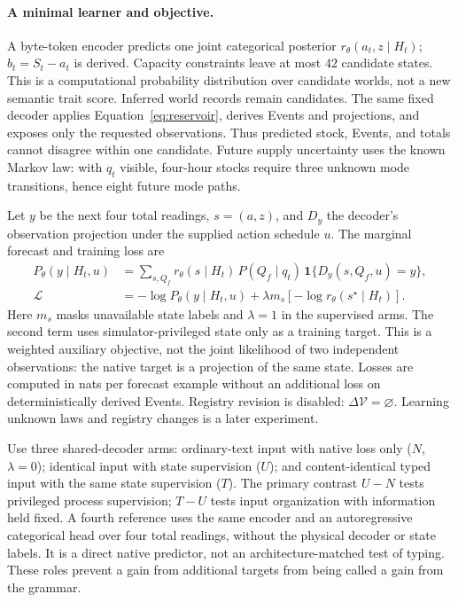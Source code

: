 \documentclass[10pt]{article}
\begin{document}
\paragraph{A minimal learner and objective.}
A byte-token encoder predicts one joint categorical posterior
$r_\theta(a_t,z\mid H_t)$; $b_t=S_t-a_t$ is derived. Capacity constraints leave
at most $42$ candidate states. This is a computational probability
distribution over candidate worlds, not a new semantic trait score. Inferred
world records remain candidates. The same fixed decoder applies
Equation~\ref{eq:reservoir}, derives Events and projections, and exposes only
the requested observations. Thus predicted stock, Events, and totals cannot
disagree within one candidate. Future supply uncertainty uses the known
Markov law: with $q_t$ visible, four-hour stocks require three unknown mode
transitions, hence eight future mode paths.

Let $y$ be the next four total readings, $s=(a,z)$, and $D_y$ the decoder's
observation projection under the supplied action schedule $u$. The marginal
forecast and training loss are
\begin{align}
 P_\theta(y\mid H_t,u)
 &=\sum_{s,Q_f}r_\theta(s\mid H_t)\,P(Q_f\mid q_t)\,
       \mathbf 1\{D_y(s,Q_f,u)=y\}, \label{eq:reservoir-marginal}\\
 \mathcal L
 &=-\log P_\theta(y\mid H_t,u)
       +\lambda m_s[-\log r_\theta(s^\star\mid H_t)] .
 \label{eq:reservoir-loss}
\end{align}
Here $m_s$ masks unavailable state labels and $\lambda=1$ in the supervised
arms. The second term uses simulator-privileged state only as a training
target. This is a weighted auxiliary objective, not the joint likelihood of
two independent observations: the native target is a projection of the same
state. Losses are computed in nats per forecast example without an additional
loss on deterministically derived Events. Registry revision is disabled:
$\Delta\mathcal V=\varnothing$. Learning unknown laws and registry changes is
a later experiment.

Use three shared-decoder arms: ordinary-text input with native loss only
($N$, $\lambda=0$); identical input with state supervision ($U$); and
content-identical typed input with the same state supervision ($T$).
The primary contrast $U-N$ tests privileged process supervision; $T-U$ tests
input organization with information held fixed. A fourth reference uses the
same encoder and an autoregressive categorical head over four total readings,
without the physical decoder or state labels. It is a direct native predictor,
not an architecture-matched test of typing. These roles prevent a gain from
additional targets from being called a gain from the grammar.
\end{document}
